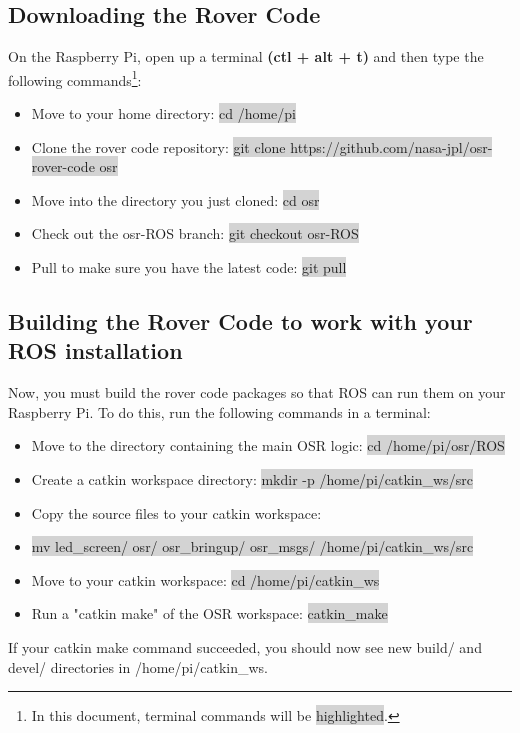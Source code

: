 \documentclass[12pt]{article}
\begin{document}
\subsection{Downloading the Rover Code}
On the Raspberry Pi, open up a terminal \textbf{(ctl + alt + t)} and then type the following commands\footnote{In this document, terminal commands will be \colorbox{lightgray}{highlighted}.}:

\begin{itemize}
	\item[] Move to your home directory: \colorbox{lightgray}{cd /home/pi}
	\item[] Clone the rover code repository: \colorbox{lightgray}{git clone https://github.com/nasa-jpl/osr-rover-code osr}
	\item[] Move into the directory you just cloned: \colorbox{lightgray}{cd osr}
	\item[] Check out the osr-ROS branch: \colorbox{lightgray}{git checkout osr-ROS}
	\item[] Pull to make sure you have the latest code: \colorbox{lightgray}{git pull}
\end{itemize}

\subsection{Building the Rover Code to work with your ROS installation}
Now, you must build the rover code packages so that ROS can run them on your Raspberry Pi.  To do this, run the following commands in a terminal:

\begin{itemize}
	\item[] Move to the directory containing the main OSR logic: \colorbox{lightgray}{cd /home/pi/osr/ROS}
	\item[] Create a catkin workspace directory: \colorbox{lightgray}{mkdir -p /home/pi/catkin\_ws/src}
	\item[] Copy the source files to your catkin workspace:
	\item[] \colorbox{lightgray}{mv led\_screen/ osr/ osr\_bringup/ osr\_msgs/ /home/pi/catkin\_ws/src}
	\item[] Move to your catkin workspace: \colorbox{lightgray}{cd /home/pi/catkin\_ws}
	\item[] Run a "catkin make" of the OSR workspace: \colorbox{lightgray}{catkin\_make}
\end{itemize}

\noindent If your catkin make command succeeded, you should now see new build/ and devel/ directories in /home/pi/catkin\_ws.
\end{document}
